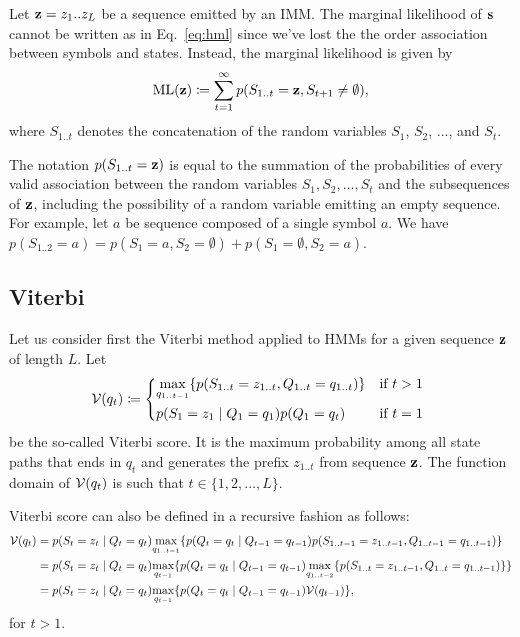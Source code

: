 Let $\mathbf{z}=z_1 .. z_L$ be a sequence emitted by an IMM.\@
The marginal likelihood of $\mathbf{s}$ cannot be written as in Eq.~\eqref{eq:hml} since
we've lost the the order association between symbols and states.
Instead, the marginal likelihood is given by
\begin{equation}\label{eq:ml}
  \mathrm{ML}(\mathbf{z}) \coloneqq \sum_{t=1}^{\infty} p(S_{1..t}=\mathbf{z}, S_{t+1}\neq \emptyset),
\end{equation}
where $S_{1..t}$ denotes the concatenation of the random variables $S_1$, $S_2$,
$\dots$, and $S_t$.

\begin{remark}
  The notation $p(S_{1..t}=\mathbf{z})$ is equal to the summation of the probabilities of every valid
  association between the random variables $S_1, S_2, \dots, S_t$ and the subsequences of $\mathbf{z}$,
  including the possibility of a random variable emitting an empty sequence. For example, let $a$ be
  sequence composed of a single symbol $a$. We have $p(S_{1..2}=a) = p(S_1=a, S_2=\emptyset) +
  p(S_1=\emptyset, S_2=a)$.
\end{remark}

\subsection{Viterbi}

Let us consider first the Viterbi method applied to HMMs for a given sequence $\mathbf{z}$ of length
$L$.
Let
\begin{equation*}
  \viterbi(q_t) \eqdef
  \begin{dcases*}
    \umax{q_{1..t-1}} \{ p(S_{1..t}=z_{1..t}, Q_{1..t}=q_{1..t}) \} & if $t>1$ \\
    p(S_1=z_1 \gv Q_1=q_1) p(Q_1=q_t)                               & if $t=1$
  \end{dcases*}
\end{equation*}
be the so-called Viterbi score. It is the maximum probability among all state paths that ends in
$q_t$ and generates the prefix $z_{1..t}$ from sequence $\mathbf{z}$.
The function domain of $\mathcal{V}(q_t)$ is such that $t \in \{1, 2, \dots, L\}$.

Viterbi score can also be defined in a recursive fashion as follows:
\begin{equation*}
\begin{split}
  \mathcal{V}(q_t)
  &= p(S_t=z_t \;|\; Q_t=q_t) \underset{q_{1..t-1}}{\max}
    \{ p(Q_t=q_t \;|\; Q_{t-1}=q_{t-1}) p(S_{1..t-1}=z_{1..t-1}, Q_{1..t-1}=q_{1..t-1}) \} \\
  &= p(S_t=z_t \;|\; Q_t=q_t) \underset{q_{t-1}}{\max}
    \{ p(Q_t=q_t \;|\; Q_{t-1}=q_{t-1})
    \underset{q_{1..t-2}}{\max} \{ p(S_{1..t}=z_{1..t-1}, Q_{1..t}=q_{1..t-1}) \} \} \\
  &= p(S_t=z_t \;|\; Q_t=q_t) \underset{q_{t-1}}{\max} \{ p(Q_t=q_t \;|\; Q_{t-1}=q_{t-1})
    \mathcal{V}(q_{t-1}) \},
\end{split}
\end{equation*}
for $t>1$.

